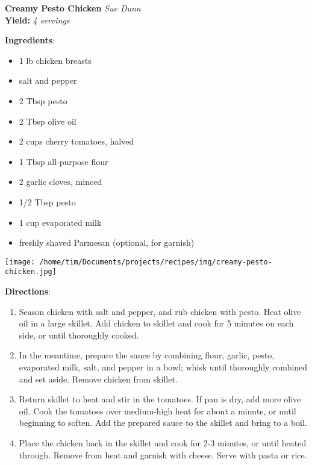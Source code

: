 \documentclass[11pt, twoside, openany]{book}
\begin{document}
\noindent\begin{minipage}[t]{\linewidth}%
{\Large\textbf{Creamy Pesto Chicken}} \label{creamy-pesto-chicken}\hfill\textit{Sue Dunn}\\
\textbf{Yield:} \textit{4 servings}\\
\noindent\begin{minipage}[t]{0.78\linewidth}%
\textbf{Ingredients}:\vspace{-3mm}
\begin{multicols}{2}
\begin{itemize}\setlength\itemsep{-1mm}
\item 1 lb chicken breasts
\item salt and pepper
\item 2 Tbsp pesto
\item 2 Tbsp olive oil
\item 2 cups cherry tomatoes, halved
\item 1 Tbsp all-purpose flour
\item 2 garlic cloves, minced
\item 1/2 Tbsp pesto
\item 1 cup evaporated milk
\item freshly shaved Parmesan (optional, for garnish)
\end{itemize}
\end{multicols}
\end{minipage}
\noindent\begin{minipage}[t]{0.18\linewidth}
\centering \strut\vspace*{-\baselineskip}\newline
\texttt{[image: /home/tim/Documents/projects/recipes/img/creamy-pesto-chicken.jpg]}\\
\end{minipage}\vspace{3mm}
\textbf{Directions}:
\vspace{-3mm}\begin{enumerate}\setlength\itemsep{-1mm}
\item Season chicken with salt and pepper, and rub chicken with pesto. Heat olive oil in a large skillet. Add chicken to skillet and cook for 5 minutes on each side, or until thoroughly cooked.
\item In the meantime, prepare the sauce by combining flour, garlic, pesto, evaporated milk, salt, and pepper in a bowl; whisk until thoroughly combined and set aside. Remove chicken from skillet.
\item Return skillet to heat and stir in the tomatoes. If pan is dry, add more olive oil. Cook the tomatoes over medium-high heat for about a minute, or until beginning to soften. Add the prepared sauce to the skillet and bring to a boil.
\item Place the chicken back in the skillet and cook for 2-3 minutes, or until heated through. Remove from heat and garnish with cheese. Serve with pasta or rice.
\end{enumerate}
\end{minipage}\vspace{8mm}
\end{document}
